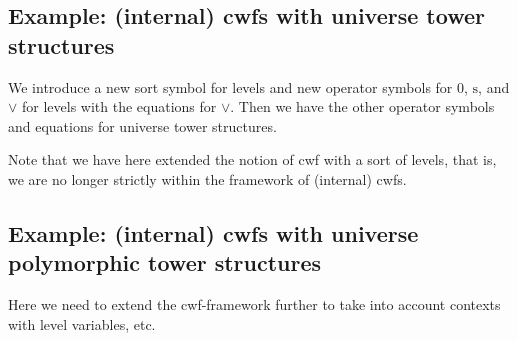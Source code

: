 \documentclass{lmcs}
\newcommand{\s}{\mathrm{s}}
\begin{document}
\subsection{Example: (internal) cwfs with universe tower structures} We introduce a new sort symbol for levels and new operator symbols for 0, $\s$, and $\vee$ for levels with the equations for $\vee$. Then we have the other operator symbols and equations for universe tower structures.

Note that we have here extended the notion of cwf with a sort of levels, that is, we are no longer strictly within the framework of (internal) cwfs.

\subsection{Example: (internal) cwfs with universe polymorphic tower structures} Here we need to extend the cwf-framework further to take into account contexts with level variables, etc.
\end{document}
